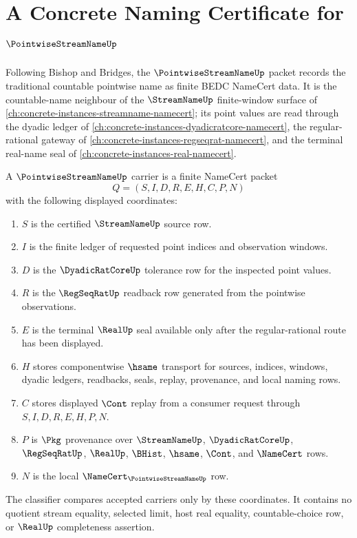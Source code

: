 \chapter{A Concrete Naming Certificate for $\PointwiseStreamNameUp$}
\label{ch:concrete-instances-pointwise-stream-namecert}

Following Bishop and Bridges, the $\PointwiseStreamNameUp$ packet records the traditional countable pointwise name as finite BEDC NameCert data. It is the countable-name neighbour of the $\StreamNameUp$ finite-window surface of \autoref{ch:concrete-instances-streamname-namecert}; its point values are read through the dyadic ledger of \autoref{ch:concrete-instances-dyadicratcore-namecert}, the regular-rational gateway of \autoref{ch:concrete-instances-regseqrat-namecert}, and the terminal real-name seal of \autoref{ch:concrete-instances-real-namecert}.

\begin{definition}
\label{def:pointwise-stream-name-carrier}
A $\PointwiseStreamNameUp$ carrier is a finite NameCert packet
$$
Q=(S,I,D,R,E,H,C,P,N)
$$
with the following displayed coordinates:
\begin{enumerate}
\item $S$ is the certified $\StreamNameUp$ source row.
\item $I$ is the finite ledger of requested point indices and observation windows.
\item $D$ is the $\DyadicRatCoreUp$ tolerance row for the inspected point values.
\item $R$ is the $\RegSeqRatUp$ readback row generated from the pointwise observations.
\item $E$ is the terminal $\RealUp$ seal available only after the regular-rational route has been displayed.
\item $H$ stores componentwise $\hsame$ transport for sources, indices, windows, dyadic ledgers, readbacks, seals, replay, provenance, and local naming rows.
\item $C$ stores displayed $\Cont$ replay from a consumer request through $S,I,D,R,E,H,P,N$.
\item $P$ is $\Pkg$ provenance over $\StreamNameUp$, $\DyadicRatCoreUp$, $\RegSeqRatUp$, $\RealUp$, $\BHist$, $\hsame$, $\Cont$, and $\NameCert$ rows.
\item $N$ is the local $\NameCert_{\PointwiseStreamNameUp}$ row.
\end{enumerate}
The classifier compares accepted carriers only by these coordinates. It contains no quotient stream equality, selected limit, host real equality, countable-choice row, or $\RealUp$ completeness assertion.
\end{definition}

